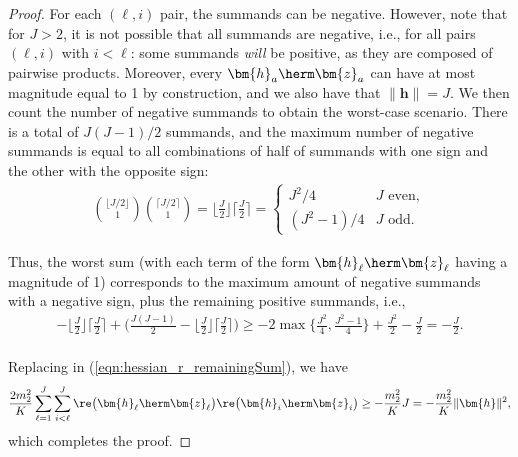 \begin{proof}
For each $({\ell},i)$ pair, the summands can be negative. However, note that for $J>2$, it is not possible that all summands are negative, i.e., for all pairs $({\ell},i)$ with $i<{\ell}$: some summands \emph{will} be positive, as they are composed of pairwise products. Moreover, every $\bm{h}_a\herm \bm{z}_a$ can have at most magnitude equal to 1 by construction, and we also have that $\|\bm{h}\|=J$. We then count the number of negative summands to obtain the worst-case scenario. There is a total of $J(J-1)/2$ summands, and the maximum number of negative summands is equal to all combinations of half of summands with one sign and the other with the opposite sign:
\begin{align}
	\binom{\lfloor J/2\rfloor}{1}\binom{\lceil J/2\rceil}{1}=\bigg\lfloor \frac{J}{2}\bigg\rfloor\bigg\lceil \frac{J}{2}\bigg\rceil=\begin{cases}
		J^2/4&J\text{ even},\\
		(J^2-1)/4&J\text{ odd}.
	\end{cases}
\end{align}

Thus, the worst sum (with each term of the form $\bm{h}_{\ell}\herm\bm{z}_{\ell}$ having a magnitude of 1) corresponds to the maximum amount of negative summands with a negative sign, plus the remaining positive summands, i.e.,  
\begin{align}
	-\bigg\lfloor \frac{J}{2}\bigg\rfloor\bigg\lceil \frac{J}{2}\bigg\rceil + \Bigg(\frac{J(J-1)}{2}-\bigg\lfloor \frac{J}{2}\bigg\rfloor\bigg\lceil \frac{J}{2}\bigg\rceil\Bigg) \geq -2\max\bigg\{\frac{J^2}{4},\frac{J^2-1}{4}\bigg\}+\frac{J^2}{2}-\frac{J}{2}=- \frac{J}{2}. \nonumber\\
\end{align}

Replacing in (\ref{eqn:hessian_r_remainingSum}), we have
\begin{align}
	\frac{2m_2^2}{K}\sum_{{\ell}=1}^J\sum_{i<{\ell}}^J\re\big(\bm{h}_{\ell}\herm \bm{z}_{\ell}\big)\re\big(\bm{h}_i\herm\bm{z}_i\big)\geq -\frac{m_2^2}{K}J=-\frac{m_2^2}{K}\|\bm{h}\|^2,
\end{align}
which completes the proof.
\end{proof}


